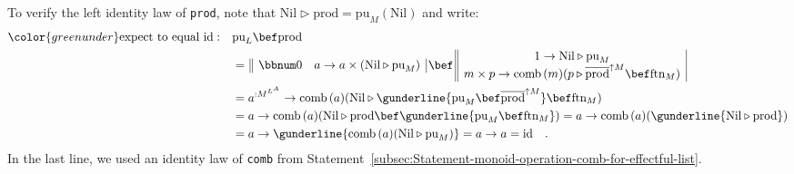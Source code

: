 To verify the left identity law of \lstinline!prod!, note that $\text{Nil}\triangleright\text{prod}=\text{pu}_{M}(\text{Nil})$
and write:
\begin{align*}
{\color{greenunder}\text{expect to equal }\text{id}:}\quad & \text{pu}_{L}\bef\text{prod}\\
 & =\,\begin{array}{||cc|}
\bbnum 0 & a\rightarrow a\times(\text{Nil}\triangleright\text{pu}_{M})\end{array}\,\bef\,\begin{array}{||c|}
1\rightarrow\text{Nil}\triangleright\text{pu}_{M}\\
m\times p\rightarrow\text{comb}\,(m)(p\triangleright\overline{\text{prod}}^{\uparrow M}\bef\text{ftn}_{M})
\end{array}\\
 & =a^{:M^{L^{A}}}\rightarrow\text{comb}\,(a)(\text{Nil}\triangleright\gunderline{\text{pu}_{M}\bef\overline{\text{prod}}^{\uparrow M}}\bef\text{ftn}_{M})\\
 & =a\rightarrow\text{comb}\,(a)(\text{Nil}\triangleright\text{prod}\bef\gunderline{\text{pu}_{M}\bef\text{ftn}_{M}})=a\rightarrow\text{comb}\,(a)(\gunderline{\text{Nil}\triangleright\text{prod}})\\
 & =a\rightarrow\gunderline{\text{comb}\,(a)(\text{Nil}\triangleright\text{pu}_{M})}=a\rightarrow a=\text{id}\quad.
\end{align*}
In the last line, we used an identity law of \lstinline!comb! from
Statement~\ref{subsec:Statement-monoid-operation-comb-for-effectful-list}.

